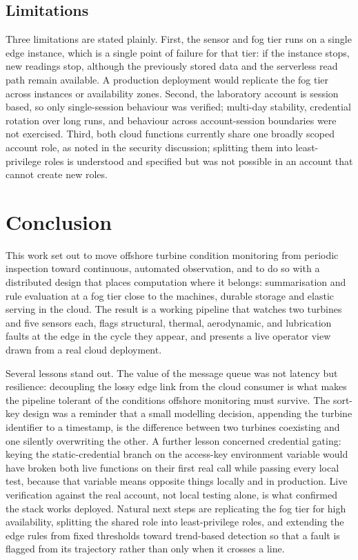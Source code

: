\documentclass[conference]{IEEEtran}
\begin{document}
\subsection{Limitations}

Three limitations are stated plainly. First, the sensor and fog tier runs on a single edge instance, which is a single point of failure for that tier: if the instance stops, new readings stop, although the previously stored data and the serverless read path remain available. A production deployment would replicate the fog tier across instances or availability zones. Second, the laboratory account is session based, so only single-session behaviour was verified; multi-day stability, credential rotation over long runs, and behaviour across account-session boundaries were not exercised. Third, both cloud functions currently share one broadly scoped account role, as noted in the security discussion; splitting them into least-privilege roles is understood and specified but was not possible in an account that cannot create new roles.

\section{Conclusion}

This work set out to move offshore turbine condition monitoring from periodic inspection toward continuous, automated observation, and to do so with a distributed design that places computation where it belongs: summarisation and rule evaluation at a fog tier close to the machines, durable storage and elastic serving in the cloud. The result is a working pipeline that watches two turbines and five sensors each, flags structural, thermal, aerodynamic, and lubrication faults at the edge in the cycle they appear, and presents a live operator view drawn from a real cloud deployment.

Several lessons stand out. The value of the message queue was not latency but resilience: decoupling the lossy edge link from the cloud consumer is what makes the pipeline tolerant of the conditions offshore monitoring must survive. The sort-key design was a reminder that a small modelling decision, appending the turbine identifier to a timestamp, is the difference between two turbines coexisting and one silently overwriting the other. A further lesson concerned credential gating: keying the static-credential branch on the access-key environment variable would have broken both live functions on their first real call while passing every local test, because that variable means opposite things locally and in production. Live verification against the real account, not local testing alone, is what confirmed the stack works deployed. Natural next steps are replicating the fog tier for high availability, splitting the shared role into least-privilege roles, and extending the edge rules from fixed thresholds toward trend-based detection so that a fault is flagged from its trajectory rather than only when it crosses a line.



\end{document}
